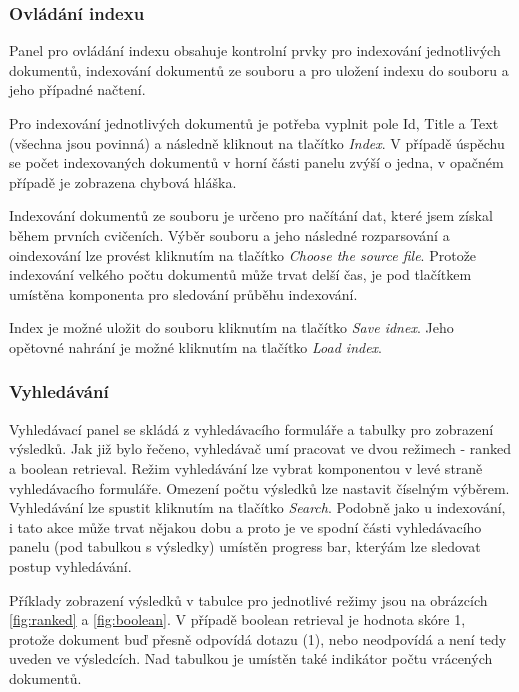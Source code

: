 \documentclass[11pt,a4paper]{scrartcl}
\begin{document}
	\subsubsection{Ovládání indexu}
	
	Panel pro ovládání indexu obsahuje kontrolní prvky pro indexování jednotlivých dokumentů, indexování dokumentů ze souboru a pro uložení indexu do souboru a jeho případné načtení.
	
	Pro indexování jednotlivých dokumentů je potřeba vyplnit pole Id, Title a Text (všechna jsou povinná) a následně kliknout na tlačítko \textit{Index}. V případě úspěchu se počet indexovaných dokumentů v horní části panelu zvýší o jedna, v opačném případě je zobrazena chybová hláška.
	
	Indexování dokumentů ze souboru je určeno pro načítání dat, které jsem získal během prvních cvičeních. Výběr souboru a jeho následné rozparsování a oindexování lze provést kliknutím na tlačítko \textit{Choose the source file}. Protože indexování velkého počtu dokumentů může trvat delší čas, je pod tlačítkem umístěna komponenta pro sledování průběhu indexování. 
	
	Index je možné uložit do souboru kliknutím na tlačítko \textit{Save idnex}. Jeho opětovné nahrání je možné kliknutím na tlačítko \textit{Load index}.

	\subsubsection{Vyhledávání}

	Vyhledávací panel se skládá z vyhledávacího formuláře a tabulky pro zobrazení výsledků. Jak již bylo řečeno, vyhledávač umí pracovat ve dvou režimech - ranked a boolean retrieval. Režim vyhledávání lze vybrat komponentou v levé straně vyhledávacího formuláře. Omezení počtu výsledků lze nastavit číselným výběrem. Vyhledávání lze spustit kliknutím na tlačítko \textit{Search}. Podobně jako u indexování, i tato akce může trvat nějakou dobu a proto je ve spodní části vyhledávacího panelu (pod tabulkou s výsledky) umístěn progress bar, kterýám lze sledovat postup vyhledávání.   
	
	Příklady zobrazení výsledků v tabulce pro jednotlivé režimy jsou na obrázcích \ref{fig:ranked} a \ref{fig:boolean}. V případě boolean retrieval je hodnota skóre 1, protože dokument buď přesně odpovídá dotazu (1), nebo neodpovídá a není tedy uveden ve výsledcích. Nad tabulkou je umístěn také indikátor počtu vrácených dokumentů.
\end{document}
